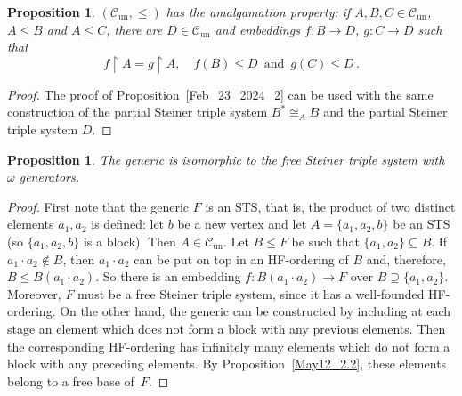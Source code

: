 \documentclass[a4paper, 11pt]{article}
\newcommand{\Cun}{\mathcal{C}_\mathrm{un}}
\theoremstyle{note}
\newtheorem{prop}[thm]{Proposition}
\begin{document}
	
    \begin{prop}\label{amalgamation} $(\Cun,\leq)$ has the amalgamation property: if $A,B,C\in\Cun$, $A\leq B$ and $A\leq C$, there are $D\in\Cun$ and embeddings $f:B\rightarrow D$,  $g: C\rightarrow D$ such that  
    $$f\restriction A= g\restriction A, \quad f(B)\leq D \, \mbox{ and } \,  g(C)\leq D \, .$$
	\end{prop}
	\begin{proof}
		The proof of Proposition~\ref{Feb_23_2024_2} can be used with the same construction of  the partial Steiner triple system $B^\ast\cong_AB$ and the partial Steiner triple system $D$.
	\end{proof}
	
	
	\begin{prop}\label{Feb_23_2024_4} The generic is isomorphic to the free Steiner triple system with $\omega$ generators.
	\end{prop}
	\begin{proof} First note that the generic $F$ is an STS, that is, the product of two distinct elements $a_1,a_2$ is defined: let $b$ be a new vertex and let $A=\{a_1,a_2,b\}$ be an STS (so $ \{a_1, a_2, b \}$ is a block). Then $A\in\Cun$.  Let $B \leq F$ be such that $  \{a_1, a_2\} \subseteq B$. If $a_1 \cdot a_2 \notin B$, then $a_1 \cdot a_2$ can be put on top in an HF-ordering of $B$ and, therefore, $B \leq B(a_1 \cdot a_2)$. So there is an embedding $f:B(a_1 \cdot a_2)\rightarrow F$ over $B \supseteq\{a_1,a_2\}$. Moreover, $F$ must be a free Steiner triple system, since it has a well-founded HF-ordering.  On the other hand, the generic can be constructed by  including at each stage an element which does not form a block with any previous elements. Then the corresponding  HF-ordering has infinitely many elements which do not form a block with any preceding elements. By Proposition~\ref{May12_2.2}, these elements belong to a free base of~$F$.
	
	\end{proof}
	
\end{document}
